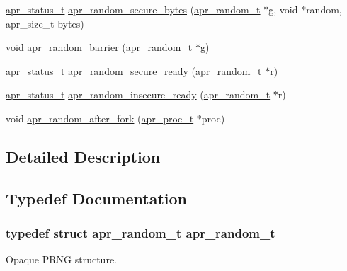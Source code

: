 \begin{DoxyCompactItemize}
\hyperlink{group__apr__errno_gaf76ee4543247e9fb3f3546203e590a6c}{apr\+\_\+status\+\_\+t} \hyperlink{group__apr__random_ga9f0607e06656a1c76cc5ee878fd94f09}{apr\+\_\+random\+\_\+secure\+\_\+bytes} (\hyperlink{group__apr__random_ga33073741e56b1bafe52ba58cefcbbf96}{apr\+\_\+random\+\_\+t} $\ast$g, void $\ast$random, apr\+\_\+size\+\_\+t bytes)
\item 
void \hyperlink{group__apr__random_ga37d8d7529cf972c605ebce97c57f8825}{apr\+\_\+random\+\_\+barrier} (\hyperlink{group__apr__random_ga33073741e56b1bafe52ba58cefcbbf96}{apr\+\_\+random\+\_\+t} $\ast$g)
\item 
\hyperlink{group__apr__errno_gaf76ee4543247e9fb3f3546203e590a6c}{apr\+\_\+status\+\_\+t} \hyperlink{group__apr__random_ga99d0c0722eeef2951e8ccede2e1451fa}{apr\+\_\+random\+\_\+secure\+\_\+ready} (\hyperlink{group__apr__random_ga33073741e56b1bafe52ba58cefcbbf96}{apr\+\_\+random\+\_\+t} $\ast$r)
\item 
\hyperlink{group__apr__errno_gaf76ee4543247e9fb3f3546203e590a6c}{apr\+\_\+status\+\_\+t} \hyperlink{group__apr__random_ga6465698bdc752d07abc8c515aac6e2c0}{apr\+\_\+random\+\_\+insecure\+\_\+ready} (\hyperlink{group__apr__random_ga33073741e56b1bafe52ba58cefcbbf96}{apr\+\_\+random\+\_\+t} $\ast$r)
\item 
void \hyperlink{group__apr__random_gaa1ab9b8adeeb6e37bb29def249ff9e6a}{apr\+\_\+random\+\_\+after\+\_\+fork} (\hyperlink{structapr__proc__t}{apr\+\_\+proc\+\_\+t} $\ast$proc)
\end{DoxyCompactItemize}


\subsection{Detailed Description}


\subsection{Typedef Documentation}
\subsubsection[{\texorpdfstring{apr\+\_\+random\+\_\+t}{apr_random_t}}]{\setlength{\rightskip}{0pt plus 5cm}typedef struct {\bf apr\+\_\+random\+\_\+t} {\bf apr\+\_\+random\+\_\+t}}\hypertarget{group__apr__random_ga33073741e56b1bafe52ba58cefcbbf96}{}\label{group__apr__random_ga33073741e56b1bafe52ba58cefcbbf96}
Opaque P\+R\+NG structure. 

